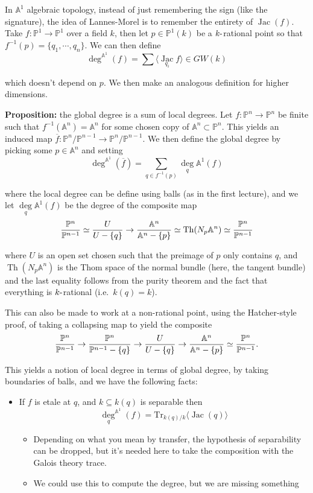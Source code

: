 \documentclass[11pt]{scrreprt}
\theoremstyle{definition}
\providecommand{\tightlist}{%
  \setlength{\itemsep}{0pt}\setlength{\parskip}{0pt}}
\newcommand{\PP}[0]{{\mathbb{P}}}
\newcommand{\Af}[0]{{\mathbb{A}}}
\newcommand{\Tr}[0]{\mathrm{Tr}}
\newcommand{\theset}[1]{\{{#1}\}}
\newcommand{\dash}[0]{{\hbox{-}}}
\newcommand{\homotopic}[0]{\simeq}
\newcommand{\inv}[0]{^{-1}}
\begin{document}
In \(\Af^1\) algebraic topology, instead of just remembering the sign
(like the signature), the idea of Lannes-Morel is to remember the
entirety of \(\operatorname{Jac}(f)\). Take \(f: \PP^1 \to \PP^1\) over a
field \(k\), then let \(p\in \PP^1(k)\) be a \(k\dash\)rational point so
that \(f\inv(p) = \theset{q_1, \cdots, q_n}\). We can then define \[
\deg^{\Af^1}(f) = \sum \langle \underset{q_i}{\operatorname{Jac}} f\rangle \in GW(k)
\]

which doesn't depend on \(p\). We then make an analogous definition for
higher dimensions.

\textbf{Proposition:} the global degree is a sum of local degrees. Let
\(f: \PP^n \to \PP^n\) be finite such that \(f\inv(\Af^n) = \Af^n\) for
some chosen copy of \(\Af^n \subset \PP^n\). This yields an induced map
\(\overline f :\PP^{n}/\PP^{n-1} \to \PP^{n}/\PP^{n-1}\). We then define
the global degree by picking some \(p\in \Af^n\) and setting \[
\deg^{\Af^1}(\overline f) = \sum_{q\in f\inv(p)}\underset{q}\deg{\Af^1}(f)
\]

where the local degree can be define using balls (as in the first
lecture), and we let \(\underset{q}\deg{\Af^1}(f)\) be the degree of the
composite map \[
{\PP^{n} \over \PP^{n-1}} \homotopic {U \over U-\theset{q}} \to {\Af^n \over \Af^n - \theset{p}} \homotopic \operatorname{Th}(N_p\Af^n) \homotopic {\PP^{n} \over \PP^{n-1}}
\]

where \(U\) is an open set chosen such that the preimage of \(p\) only
contains \(q\), and \(\operatorname{Th}(N_p\Af^n)\) is the Thom space of the
normal bundle (here, the tangent bundle) and the last equality follows
from the purity theorem and the fact that everything is
\(k\dash\)rational (i.e.~\(k(q) = k\)).

This can also be made to work at a non-rational point, using the
Hatcher-style proof, of taking a collapsing map to yield the composite
\[
{\PP^{n} \over \PP^{n-1}} \to {\PP^{n} \over \PP^{n-1} -\theset{q}}\to {U \over U-\theset{q}} \to {\Af^n \over \Af^n - \theset{p}} \homotopic {\PP^{n} \over \PP^{n-1}}.
\]

This yields a notion of local degree in terms of global degree, by
taking boundaries of balls, and we have the following facts:

\begin{itemize}
\tightlist
\item
  If \(f\) is etale at \(q\), and \(k \subseteq k(q)\) is separable then
  \[\underset q \deg^{\Af^1} (f) = \Tr_{k(q)/k} \langle \operatorname{Jac}(q) \rangle\]

  \begin{itemize}
  \tightlist
  \item
    Depending on what you mean by transfer, the hypothesis of
    separability can be dropped, but it's needed here to take the
    composition with the Galois theory trace.
  \item
    We could use this to compute the degree, but we are missing
    something
  \end{itemize}
\end{itemize}
\end{document}
